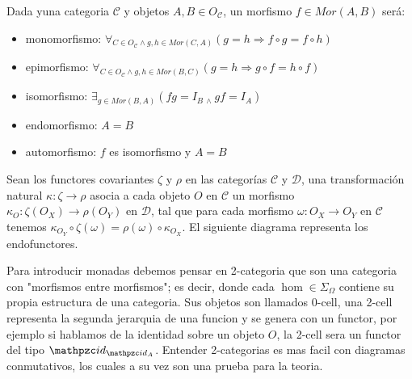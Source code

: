 \begin{defn}
Dada yuna categoria $\mathcal{C}$ y objetos $ A,B \in O_{\mathcal{C}}$, un morfismo $f \in Mor(A,B)$ será:
\end{defn}
\begin{itemize}
\item monomorfismo: $\forall_{ C \in O_{\mathcal{C}} \wedge g,h \in Mor(C,A)}(g=h \Rightarrow f \circ g=f\circ h)$
\item epimorfismo: $\forall_{ C \in O_{\mathcal{C}} \wedge g,h \in Mor(B,C)}(g=h \Rightarrow g \circ f=h\circ f)$
\item isomorfismo: $\exists_{g \in Mor(B,A)} ( fg = I_{B} \ _{\wedge} \ gf = I_{A})$
\item endomorfismo: $A=B$
\item automorfismo: $f$ es isomorfismo y $A=B$
\end{itemize}

\begin{defn}\end{defn}
Sean los functores covariantes $\zeta$ y $\rho$ en las categorías $\mathcal{C}$ y $\mathcal{D}$, una transformación natural $\kappa : \zeta \rightarrow \rho$ asocia a cada objeto $O$ en $\mathcal{C}$ un morfismo 
$\kappa_{O} : \zeta(O_X) \rightarrow \rho(O_Y)$ en $\mathcal{D}$, tal que para cada morfismo $\omega : O_X \rightarrow O_Y$ en $\mathcal{C}$ tenemos $\kappa_{O_Y} \circ \zeta(\omega) = \rho(\omega) \circ \kappa_{O_X}$. El siguiente diagrama representa los endofunctores.

\begin{figure}[h!]
\centerline{
}
\end{figure}

\begin{note}
Para introducir monadas debemos pensar en 2-categoria que son una categoria con "morfismos entre morfismos"; es decir, donde cada $\hom \in \Sigma_{\Omega}$ contiene su propia estructura de una categoria. Sus objetos son llamados 0-cell, una 2-cell representa la segunda jerarquia de una funcion y se genera con un functor, por ejemplo si hablamos de la identidad sobre un objeto $O$, la 2-cell sera un functor del tipo $\id_{\id_{A}}$. Entender 2-categorias es mas facil con diagramas conmutativos, los cuales a su vez son una prueba para la teoria.
\end{note}

